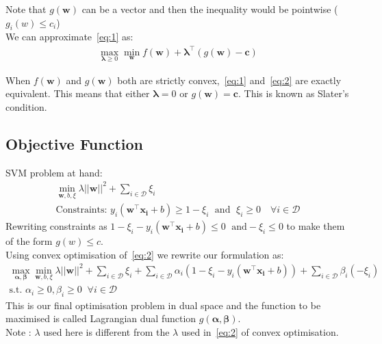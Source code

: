 \documentclass[12pt]{article}
\begin{document}
\noindent Note that $g(\boldsymbol{w})$ can be a vector and then the inequality would be pointwise ($g_i(w) \leq c_i$) \\ 
We can approximate~\eqref{eq:1} as:
\begin{gather}
    \max_{\boldsymbol{\lambda} \geq 0}\min_{\boldsymbol{w}} f(\boldsymbol{w}) + \boldsymbol{\lambda}^\top(g(\boldsymbol{w})-\boldsymbol{c}) \label{eq:2} 
\end{gather}

\noindent When $f(\boldsymbol{w})$ and $g(\boldsymbol{w})$ both are strictly convex,~\eqref{eq:1} and~\eqref{eq:2} are exactly equivalent. This means that either $\boldsymbol{\lambda}=0 $ or $g\boldsymbol{(w)=c}$. This is known as Slater's condition.

\subsection{Objective Function}
SVM problem at hand:
\begin{gather*}
    \min_{\boldsymbol{w},b,{\xi}} \lambda || \boldsymbol{w} ||^2 + \sum_{i \in \mathcal{D}} \xi_i \\
    \text{Constraints: } y_i(\boldsymbol{w}^\top \boldsymbol{x_i}+b) \geq 1-\xi_i \; \text{ and } \; \xi_i \geq 0 \quad \forall i \in \mathcal{D}
\end{gather*}
Rewriting constraints as $ 1-\xi_i- y_i(\boldsymbol{w}^\top\boldsymbol{x_i}+b) \leq 0\; \text{ and} -\xi_i \leq 0$
to make them of the form $g(w) \leq c$. \\
Using convex optimisation of~\eqref{eq:2} we rewrite our formulation as:
\begin{gather*}
    \max_{\boldsymbol{\alpha}, \boldsymbol{\beta}} \min_{\boldsymbol{w},b,{\xi}} \lambda || \boldsymbol{w} ||^2 + \sum_{i \in \mathcal{D}} \xi_i + \sum_{i \in \mathcal{D}} \alpha_i(1-\xi_i-y_i(\boldsymbol{w}^\top\boldsymbol{x_i}+b)) + \sum_{i \in \mathcal{D}} \beta_i(-\xi_i) \\
    \text{s.t. } \alpha_i \geq 0, \beta_i \geq 0  \; \; \forall i \in \mathcal{D}
\end{gather*}
This is our final optimisation problem in dual space and the function to be maximised is called Lagrangian dual function $g(\boldsymbol{\alpha,\beta})$. \\Note : $\lambda$ used here is different from the $\lambda$ used in~\eqref{eq:2} of convex optimisation. 
\end{document}
